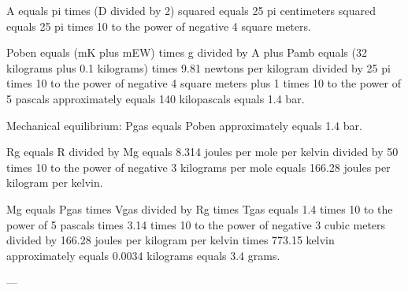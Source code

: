 A equals pi times (D divided by 2) squared equals 25 pi centimeters squared equals 25 pi times 10 to the power of negative 4 square meters.  

Poben equals (mK plus mEW) times g divided by A plus Pamb equals (32 kilograms plus 0.1 kilograms) times 9.81 newtons per kilogram divided by 25 pi times 10 to the power of negative 4 square meters plus 1 times 10 to the power of 5 pascals approximately equals 140 kilopascals equals 1.4 bar.  

Mechanical equilibrium: Pgas equals Poben approximately equals 1.4 bar.  

Rg equals R divided by Mg equals 8.314 joules per mole per kelvin divided by 50 times 10 to the power of negative 3 kilograms per mole equals 166.28 joules per kilogram per kelvin.  

Mg equals Pgas times Vgas divided by Rg times Tgas equals 1.4 times 10 to the power of 5 pascals times 3.14 times 10 to the power of negative 3 cubic meters divided by 166.28 joules per kilogram per kelvin times 773.15 kelvin approximately equals 0.0034 kilograms equals 3.4 grams.  

---